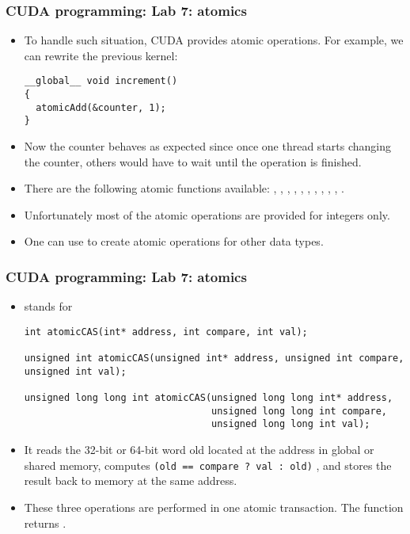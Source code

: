 \begin{frame}[fragile]
  \frametitle{CUDA programming: Lab 7: atomics}
\begin{itemize}
\item To handle such situation, CUDA provides atomic operations. For example, we can rewrite the previous kernel:
{\color{mycolorcode}
\begin{verbatim}
__global__ void increment()
{
  atomicAdd(&counter, 1);
}
\end{verbatim}
}
\item Now the counter behaves as expected since once one thread starts changing the counter, others 
  would have to wait until the operation is finished.
\item There are the following atomic functions available: , , , , , 
  , , , , , .
\item Unfortunately most of the atomic operations are provided for integers only.
\item One can use  to create atomic operations for other data types.
\end{itemize}
\end{frame}


\begin{frame}[fragile]
  \frametitle{CUDA programming: Lab 7: atomics}
\begin{itemize}
\item {} stands for 
{\tiny
{\color{mycolorcode}
\begin{verbatim}
int atomicCAS(int* address, int compare, int val);

unsigned int atomicCAS(unsigned int* address, unsigned int compare, unsigned int val);

unsigned long long int atomicCAS(unsigned long long int* address, 
                                 unsigned long long int compare, 
                                 unsigned long long int val);
\end{verbatim}
}
}
\item It reads the 32-bit or 64-bit word old located at the address  in global or shared
  memory, computes {\color{mycolorcode}\verb|(old == compare ? val : old)|} , and stores the result back
  to memory at the same address. 
\item These three operations are performed in one atomic
  transaction. The function returns .
\end{itemize}
\end{frame}


